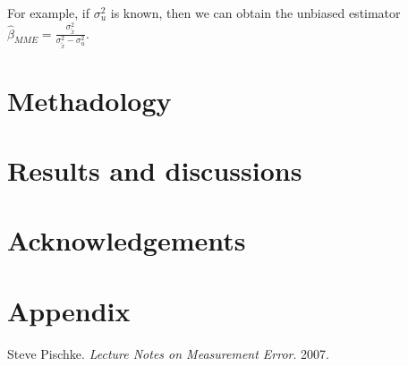 \documentclass{article}
\begin{document}
For example, if $\sigma_u^2$ is known, then we can obtain the unbiased estimator $\hat{\beta}_{MME} = \frac{\sigma^2_{\tilde{x}}}{\sigma^2_{\tilde{x}} - \sigma^2_u}$.



\section{Methadology}

\section{Results and discussions}

\section{Acknowledgements}

\section{Appendix}

\begin{thebibliography}{9}

    Steve Pischke.
    \textit{Lecture Notes on Measurement Error}.
    2007.
\end{thebibliography}
\end{document}
